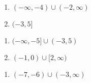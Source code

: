 \begin{multicols}{2}
\begin{enumerate}	\setcounter{enumi}{\value{Review}}
    \item $(-\infty, -4) \cup (-2, \infty)$
    \item $(-3, 5]$
\end{enumerate} \setcounter{Review}{\value{enumi}}
\end{multicols}
\begin{multicols}{2}
\begin{enumerate}	\setcounter{enumi}{\value{Review}}
    \item $(-\infty, -5] \cup (-3, 5)$
    \item $(-1, 0) \cup [2, \infty)$
\end{enumerate} \setcounter{Review}{\value{enumi}}
\end{multicols}
\begin{multicols}{2}
\begin{enumerate}	\setcounter{enumi}{\value{Review}}
    \item $(-7, -6) \cup (-3, \infty)$
\end{enumerate}
\end{multicols}